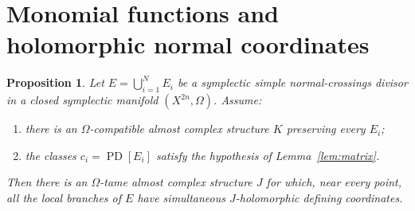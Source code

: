 \documentclass[11pt]{article}
\newtheorem{proposition}[theorem]{Proposition}
\theoremstyle{definition}
\theoremstyle{remark}
\newcommand{\PD}{\operatorname{PD}}
\begin{document}
\section{Monomial functions and holomorphic normal coordinates}

\begin{proposition}\label{prop:redundant-case}
Let $E=\bigcup_{i=1}^{N}E_i$ be a symplectic simple
normal-crossings divisor in a closed symplectic manifold
$(X^{2n},\Omega)$.  Assume:
\begin{enumerate}[label=\textup{(\alph*)}]
\item there is an $\Omega$-compatible almost complex structure
      $K$ preserving every $E_i$;
\item the classes $c_i=\PD[E_i]$ satisfy the hypothesis of
      Lemma~\ref{lem:matrix}.
\end{enumerate}
Then there is an $\Omega$-tame almost complex structure $J$
for which, near every point, all the local branches of $E$
have simultaneous $J$-holomorphic defining coordinates.
\end{proposition}
\end{document}
